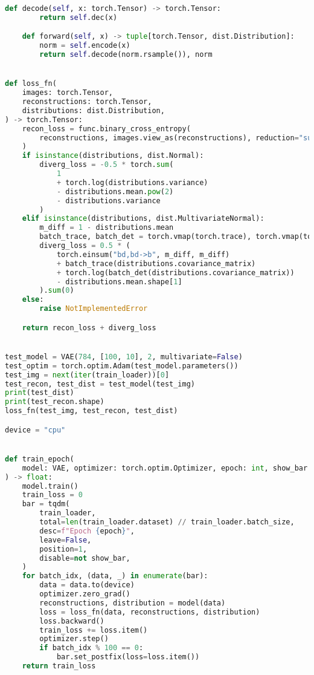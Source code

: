 \documentclass[11pt]{article} %
\begin{document}
\begin{lstlisting}[language=Python]
    def decode(self, x: torch.Tensor) -> torch.Tensor:
        return self.dec(x)

    def forward(self, x) -> tuple[torch.Tensor, dist.Distribution]:
        norm = self.encode(x)
        return self.decode(norm.rsample()), norm


def loss_fn(
    images: torch.Tensor,
    reconstructions: torch.Tensor,
    distributions: dist.Distribution,
) -> torch.Tensor:
    recon_loss = func.binary_cross_entropy(
        reconstructions, images.view_as(reconstructions), reduction="sum"
    )
    if isinstance(distributions, dist.Normal):
        diverg_loss = -0.5 * torch.sum(
            1
            + torch.log(distributions.variance)
            - distributions.mean.pow(2)
            - distributions.variance
        )
    elif isinstance(distributions, dist.MultivariateNormal):
        m_diff = 1 - distributions.mean
        batch_trace, batch_det = torch.vmap(torch.trace), torch.vmap(torch.det)
        diverg_loss = 0.5 * (
            torch.einsum("bd,bd->b", m_diff, m_diff)
            + batch_trace(distributions.covariance_matrix)
            + torch.log(batch_det(distributions.covariance_matrix))
            - distributions.mean.shape[1]
        ).sum(0)
    else:
        raise NotImplementedError

    return recon_loss + diverg_loss


test_model = VAE(784, [100, 10], 2, multivariate=False)
test_optim = torch.optim.Adam(test_model.parameters())
test_img = next(iter(train_loader))[0]
test_recon, test_dist = test_model(test_img)
print(test_dist)
print(test_recon.shape)
loss_fn(test_img, test_recon, test_dist)

device = "cpu"


def train_epoch(
    model: VAE, optimizer: torch.optim.Optimizer, epoch: int, show_bar: bool = True
) -> float:
    model.train()
    train_loss = 0
    bar = tqdm(
        train_loader,
        total=len(train_loader.dataset) // train_loader.batch_size,
        desc=f"Epoch {epoch}",
        leave=False,
        position=1,
        disable=not show_bar,
    )
    for batch_idx, (data, _) in enumerate(bar):
        data = data.to(device)
        optimizer.zero_grad()
        reconstructions, distribution = model(data)
        loss = loss_fn(data, reconstructions, distribution)
        loss.backward()
        train_loss += loss.item()
        optimizer.step()
        if batch_idx % 100 == 0:
            bar.set_postfix(loss=loss.item())
    return train_loss



\end{lstlisting}
\end{document}

